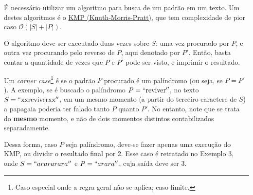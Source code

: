 É necessário utilizar um algoritmo para busca de um padrão em um texto. Um destes algoritmos é o \href{https://cp-algorithms.com/string/prefix-function.html}{KMP (Knuth-Morris-Pratt)}, que tem complexidade de pior caso $\mathcal{O}(|S|+|P|)$.

O algoritmo deve ser executado duas vezes sobre $S$: uma vez procurado por $P$, e outra vez procurando pelo reverso de $P$, aqui denotado por $P'$. Então, basta contar a quantidade de vezes que $P$ e $P'$ pode ser visto, e imprimir o resultado.

Um \textit{corner case}\footnote{Caso especial onde a regra geral não se aplica; caso limite.} é se o padrão $P$ procurado é um palíndromo (ou seja, se $P=P'$). A exemplo, se é buscado o palíndromo $P=``\text{reviver}''$, no texto $S=``\text{xxreviverxx}''$, em um mesmo momento (a partir do terceiro caractere de $S$) a papagaia poderia ter falado tanto $P$ quanto $P'$. No entanto, note que se trata do \textbf{mesmo} momento, e não de dois momentos distintos contabilizados separadamente. 

Dessa forma, caso $P$ seja palíndromo, deve-se fazer apenas uma execução do KMP, ou dividir o resultado final por 2. Esse caso é retratado no Exemplo 3, onde $S=``arararara''$ e $P=``arara''$, cuja saída deve ser $3$.
